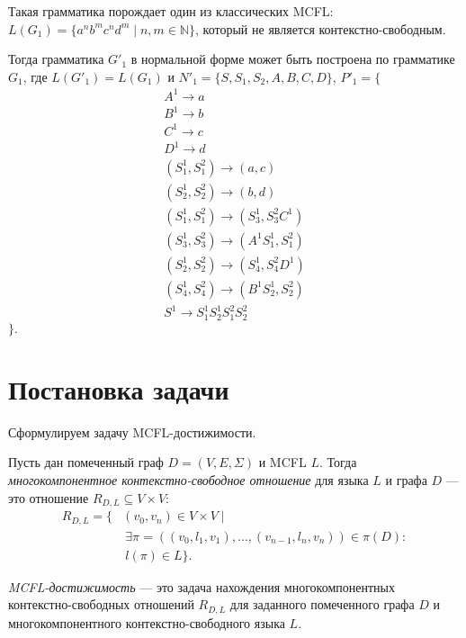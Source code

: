 Такая грамматика порождает один из классических MCFL: $L(G_1) = \{a^nb^mc^nd^m \mid n,m \in \mathbb{N}\}$, который не является контекстно-свободным.

Тогда грамматика $G'_1$ в нормальной форме может быть построена по грамматике $G_1$, где $L(G'_1) = L(G_1)$ и $N'_1 = \{S, S_1, S_2, A, B, C, D\}$, $P'_1 = \{$
\begin{align*}
	A^1 \rightarrow a \\
	B^1 \rightarrow b \\
	C^1 \rightarrow c \\
	D^1 \rightarrow d \\
	(S_1^1, S_1^2) \rightarrow (a,c) \\
	(S_2^1, S_2^2) \rightarrow (b,d) \\
	(S_1^1, S_1^2) \rightarrow (S_3^1, S_3^2 C^1) \\
	(S_3^1, S_3^2) \rightarrow (A^1 S_1^1, S_1^2) \\
	(S_2^1, S_2^2) \rightarrow (S_4^1, S_4^2 D^1) \\
	(S_4^1, S_4^2) \rightarrow (B^1 S_2^1, S_2^2) \\
	S^1 \rightarrow S_1^1 S_2^1 S_1^2 S_2^2
\end{align*}
$\}.$

\section{Постановка задачи}
Сформулируем задачу MCFL-достижимости.

\begin{definition}
	Пусть дан помеченный граф $D = (V, E, \Sigma)$ и MCFL $L$. Тогда \emph{многокомпонентное контекстно-свободное отношение} для языка $L$ и графа $D$ --- это отношение $R_{D, L} \subseteq V \times V$:
	\begin{equation*} \label{eq1}
		\begin{split}
			R_{D, L} = \{ &(v_0, v_n) \in V \times V  \mid \\ &\ \exists \pi = ((v_0, l_1, v_1), \ldots, (v_{n-1}, l_n, v_n)) \in \pi(D): \\
			&\ l(\pi) \in L \}.
		\end{split}
	\end{equation*}
\end{definition}

\begin{definition}
	\emph{MCFL-достижимость} --- это задача нахождения  многокомпонентных контекстно-свободных отношений $R_{D, L}$ для заданного помеченного графа $D$ и многокомпонентного контекстно-свободного языка $L$.
\end{definition}

